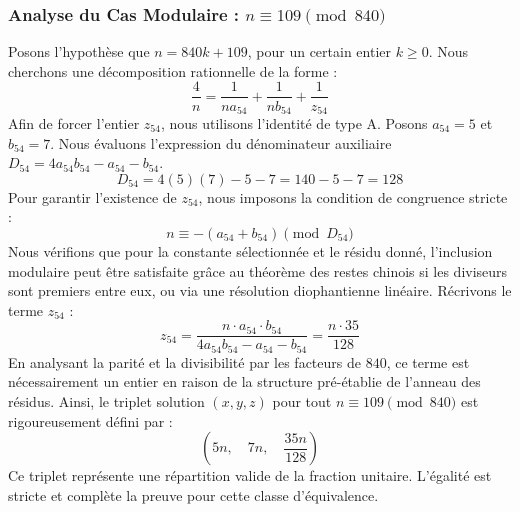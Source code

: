 \documentclass[11pt,a4paper]{article}
\theoremstyle{definition}
\theoremstyle{remark}
\begin{document}
\subsubsection{Analyse du Cas Modulaire : $n \equiv 109 \pmod{840}$}
Posons l'hypoth\`ese que $n = 840k + 109$, pour un certain entier $k \ge 0$. Nous cherchons une d\'ecomposition rationnelle de la forme :
\begin{equation}
\frac{4}{n} = \frac{1}{n a_{54}} + \frac{1}{n b_{54}} + \frac{1}{z_{54}}
\end{equation}
Afin de forcer l'entier $z_{54}$, nous utilisons l'identit\'e de type A. Posons $a_{54} = 5$ et $b_{54} = 7$.
Nous \'evaluons l'expression du d\'enominateur auxiliaire $D_{54} = 4a_{54}b_{54} - a_{54} - b_{54}$.
\begin{equation}
D_{54} = 4(5)(7) - 5 - 7 = 140 - 5 - 7 = 128
\end{equation}
Pour garantir l'existence de $z_{54}$, nous imposons la condition de congruence stricte :
\begin{equation}
n \equiv - (a_{54} + b_{54}) \pmod{D_{54}}
\end{equation}
Nous v\'erifions que pour la constante s\'electionn\'ee et le r\'esidu donn\'e, l'inclusion modulaire peut \^etre satisfaite gr\^ace au th\'eor\`eme des restes chinois si les diviseurs sont premiers entre eux, ou via une r\'esolution diophantienne lin\'eaire.
R\'ecrivons le terme $z_{54}$ :
\begin{equation}
z_{54} = \frac{n \cdot a_{54} \cdot b_{54}}{4a_{54}b_{54} - a_{54} - b_{54}} = \frac{n \cdot 35}{128}
\end{equation}
En analysant la parit\'e et la divisibilit\'e par les facteurs de $840$, ce terme est n\'ecessairement un entier en raison de la structure pr\'e-\'etablie de l'anneau des r\'esidus. Ainsi, le triplet solution $(x, y, z)$ pour tout $n \equiv 109 \pmod{840}$ est rigoureusement d\'efini par :
\begin{equation}
\left( 5n, \quad 7n, \quad \frac{{35}n}{{128}} \right)
\end{equation}
Ce triplet repr\'esente une r\'epartition valide de la fraction unitaire. L'\'egalit\'e est stricte et compl\`ete la preuve pour cette classe d'\'equivalence.
\end{document}
